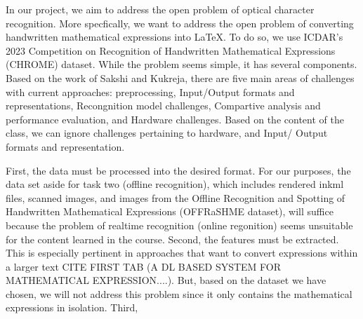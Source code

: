 \documentclass[../proposal.tex]{subfiles}
\begin{document}
In our project, we aim to address the open problem of optical character recognition. More specfically, we want to address the open problem of converting handwritten mathematical expressions into LaTeX. To do so, we use ICDAR's 2023 Competition on Recognition of Handwritten Mathematical Expressions (CHROME) dataset. While the problem seems simple, it has several components. Based on the work of Sakshi and Kukreja, there are five main areas of challenges with current approaches: preprocessing, Input/Output formats and representations, Recongnition model challenges, Compartive analysis and performance evaluation, and Hardware challenges. Based on the content of the class, we can ignore challenges pertaining to hardware, and Input/ Output formats and representation.




First, the data must be processed into the desired format. For our purposes, the data set aside for task two (offline recognition), which includes rendered inkml files, scanned images, and images from the Offline Recognition and Spotting of Handwritten Mathematical Expressions (OFFRaSHME dataset), will suffice because the problem of realtime recognition (online regonition) seems unsuitable for the content learned in the course. Second, the features must be extracted. This is especially pertinent in approaches that want to convert expressions within a larger text CITE FIRST TAB (A DL BASED SYSTEM FOR MATHEMATICAL EXPRESSION....). But, based on the dataset we have chosen, we will not address this problem since it only contains the mathematical expressions in isolation. Third, 
\end{document}
